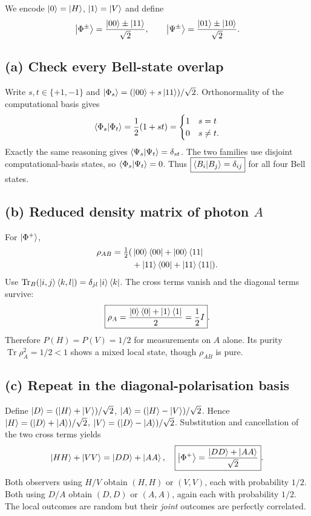 
We encode \(\ket0=\ket H\), \(\ket1=\ket V\) and define
\[
\ket{\Phi^\pm}=\frac{\ket{00}\pm\ket{11}}{\sqrt2},
\qquad
\ket{\Psi^\pm}=\frac{\ket{01}\pm\ket{10}}{\sqrt2}.
\]
\subsection*{(a) Check every Bell-state overlap}
Write \(s,t\in\{+1,-1\}\) and
\(\ket{\Phi_s}=(\ket{00}+s\ket{11})/\sqrt2\).
Orthonormality of the computational basis gives
\[
\braket{\Phi_s}{\Phi_t}
=\frac12(1+st)
=\begin{cases}1&s=t\\0&s\ne t.\end{cases}
\]
Exactly the same reasoning gives
\(\braket{\Psi_s}{\Psi_t}=\delta_{st}\).
The two families use disjoint computational-basis
states, so \(\braket{\Phi_s}{\Psi_t}=0\).
Thus \(\boxed{\braket{B_i}{B_j}=\delta_{ij}}\)
for all four Bell states.

\subsection*{(b) Reduced density matrix of photon \(A\)}
For \(\ket{\Phi^+}\),
\[
\begin{aligned}
\rho_{AB}=\tfrac12(&\ket{00}\bra{00}
+\ket{00}\bra{11}\\
&+\ket{11}\bra{00}+\ket{11}\bra{11}).
\end{aligned}
\]
Use
\(\operatorname{Tr}_B(\ket{i,j}\bra{k,l})
=\delta_{jl}\ket i\bra k\).
The cross terms vanish and the diagonal terms survive:
\[
\boxed{\rho_A=\frac{\ket0\bra0+\ket1\bra1}{2}
=\frac12I}.
\]
Therefore \(P(H)=P(V)=1/2\) for measurements
on \(A\) alone. Its purity
\(\operatorname{Tr}\rho_A^2=1/2<1\) shows a
mixed local state, though \(\rho_{AB}\) is pure.

\subsection*{(c) Repeat in the diagonal-polarisation basis}
Define
\(\ket D=(\ket H+\ket V)/\sqrt2\),
\(\ket A=(\ket H-\ket V)/\sqrt2\).
Hence
\(\ket H=(\ket D+\ket A)/\sqrt2\),
\(\ket V=(\ket D-\ket A)/\sqrt2\).
Substitution and cancellation of the two cross terms yields
\[
\ket{HH}+\ket{VV}=\ket{DD}+\ket{AA},
\quad
\boxed{\ket{\Phi^+}
=\frac{\ket{DD}+\ket{AA}}{\sqrt2}}.
\]
Both observers using \(H/V\) obtain
\((H,H)\) or \((V,V)\), each with probability \(1/2\).
Both using \(D/A\) obtain \((D,D)\) or \((A,A)\),
again each with probability \(1/2\).
The local outcomes are random but their
\emph{joint} outcomes are perfectly correlated.
